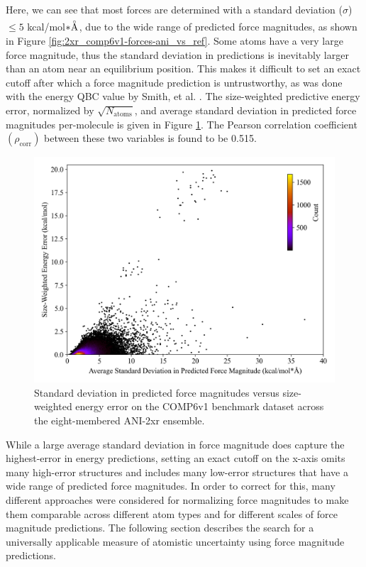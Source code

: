 Here, we can see that most forces are determined with a standard deviation ($\sigma$) $\leq 5$ kcal/mol$*\angstrom$, due to the wide range of predicted force magnitudes, as shown in Figure \ref{fig:2xr_comp6v1-forces-ani_vs_ref}.
Some atoms have a very large force magnitude, thus the standard deviation in predictions is inevitably larger than an atom near an equilibrium position.
This makes it difficult to set an exact cutoff after which a force magnitude prediction is untrustworthy, as was done with the energy QBC value by Smith, et al. \cite{ani-1x}.
The size-weighted predictive energy error, normalized by $\sqrt{N_{\text{atoms}}}$, and average standard deviation in predicted force magnitudes per-molecule is given in Figure \ref{fig:2xr_comp6v1-forces-stdev-vs-energy-error}. The Pearson correlation coefficient $(\rho_{\text{corr}})$ between these two variables is found to be 0.515.

\begin{figure}[H]
    \centering
    \includegraphics[width=1\linewidth]{Images/2xr_forces/force_stdev-vs-energy_error.png}
    \caption[Standard deviation in predicted force magnitudes]{Standard deviation in predicted force magnitudes versus size-weighted energy error on the COMP6v1 benchmark dataset across the eight-membered ANI-2xr ensemble.}
    \label{fig:2xr_comp6v1-forces-stdev-vs-energy-error}
\end{figure}

While a large average standard deviation in force magnitude does capture the highest-error in energy predictions, setting an exact cutoff on the x-axis omits many high-error structures and includes many low-error structures that have a wide range of predicted force magnitudes.
In order to correct for this, many different approaches were considered for normalizing force magnitudes to make them comparable across different atom types and for different scales of force magnitude predictions. 
The following section describes the search for a universally applicable measure of atomistic uncertainty using force magnitude predictions.


